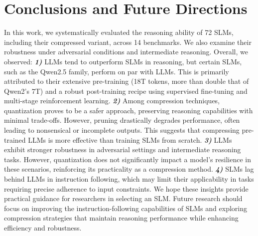 \section{Conclusions and Future Directions}
\label{section:5}
In this work, we systematically evaluated the reasoning ability of 72 SLMs, including their compressed variant, across 14 benchmarks. We also examine their robustness under adversarial conditions and intermediate reasoning. Overall, we observed: \textbf{\textit{1)}} LLMs tend to outperform SLMs in reasoning, but certain SLMs, such as the Qwen2.5 family, perform on par with LLMs. This is primarily attributed to their extensive pre-training (18T tokens, more than double that of Qwen2’s 7T) and a robust post-training recipe using supervised fine-tuning and multi-stage reinforcement learning. \textbf{\textit{2)}} Among compression techniques, quantization proves to be a safer approach, preserving reasoning capabilities with minimal trade-offs. However, pruning drastically degrades performance, often leading to nonsensical or incomplete outputs. This suggests that compressing pre-trained LLMs is more effective than training SLMs from scratch. \textbf{\textit{3)}} LLMs exhibit stronger robustness in adversarial settings and intermediate reasoning tasks. However, quantization does not significantly impact a model’s resilience in these scenarios, reinforcing its practicality as a compression method. \textbf{\textit{4)}} SLMs lag behind LLMs in instruction following, which may limit their applicability in tasks requiring precise adherence to input constraints. We hope these insights provide practical guidance for researchers in selecting an SLM. Future research should focus on improving the instruction-following capabilities of SLMs and exploring compression strategies that maintain reasoning performance while enhancing efficiency and robustness.

\newpage

